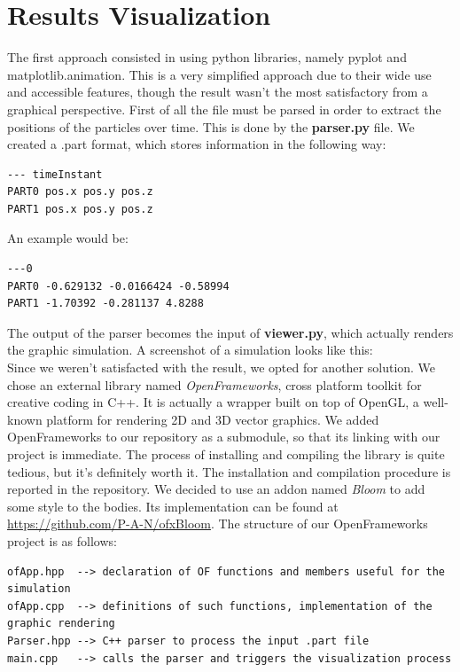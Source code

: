 \documentclass{article}
\begin{document}
\newpage
\section{Results Visualization}
The first approach consisted in using python libraries, namely pyplot and matplotlib.animation. This is a very simplified approach due to their wide use and accessible features, though the result wasn't the most satisfactory from a graphical perspective. First of all the file must be parsed in order to extract the positions of the particles over time. This is done by the \textbf{parser.py} file. We created a .part format, which stores information in the following way: \\
\begin{verbatim}
--- timeInstant
PART0 pos.x pos.y pos.z
PART1 pos.x pos.y pos.z
\end{verbatim}
An example would be:
\begin{verbatim}
---0
PART0 -0.629132 -0.0166424 -0.58994
PART1 -1.70392 -0.281137 4.8288
\end{verbatim}

\noindent The output of the parser becomes the input of \textbf{viewer.py}, which actually renders the graphic simulation. 
A screenshot of a simulation looks like this: \\
        
Since we weren't satisfacted with the result, we opted for another solution. We chose an external library named \textit{OpenFrameworks}, cross platform toolkit for creative coding in C++. It is actually a wrapper built on top of OpenGL, a well-known platform for rendering 2D and 3D vector graphics. We added OpenFrameworks to our repository as a submodule, so that its linking with our project is immediate. The process of installing and compiling the library is quite tedious, but it's definitely worth it. The installation and compilation procedure is reported in the repository. We decided to use an addon named \textit{Bloom} to add some style to the bodies. Its implementation can be found at \url{https://github.com/P-A-N/ofxBloom}. The structure of our OpenFrameworks project is as follows:
\begin{verbatim}
ofApp.hpp  --> declaration of OF functions and members useful for the simulation
ofApp.cpp  --> definitions of such functions, implementation of the graphic rendering
Parser.hpp --> C++ parser to process the input .part file
main.cpp   --> calls the parser and triggers the visualization process 
\end{verbatim}
\end{document}
